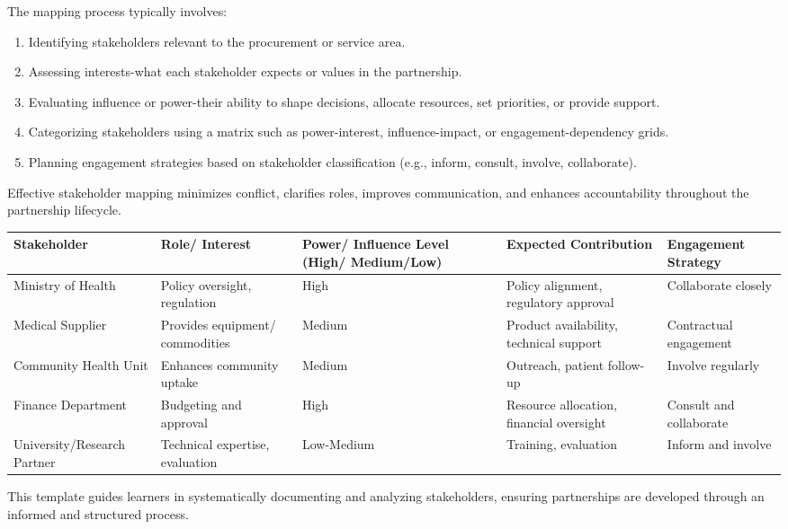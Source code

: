 \documentclass[10pt]{article}
\begin{document}
The mapping process typically involves:

\begin{enumerate}
  \item Identifying stakeholders relevant to the procurement or service area.
  \item Assessing interests-what each stakeholder expects or values in the partnership.
  \item Evaluating influence or power-their ability to shape decisions, allocate resources, set priorities, or provide support.
  \item Categorizing stakeholders using a matrix such as power-interest, influence-impact, or engagement-dependency grids.
  \item Planning engagement strategies based on stakeholder classification (e.g., inform, consult, involve, collaborate).
\end{enumerate}

Effective stakeholder mapping minimizes conflict, clarifies roles, improves communication, and enhances accountability throughout the partnership lifecycle.

\begin{table}[h]
\begin{center}
\begin{tabular}{|l|l|l|l|l|}
\hline
Stakeholder & Role/ Interest & Power/ Influence Level (High/ Medium/Low) & Expected Contribution & Engagement Strategy \\
\hline
Ministry of Health & Policy oversight, regulation & High & Policy alignment, regulatory approval & Collaborate closely \\
\hline
Medical Supplier & Provides equipment/ commodities & Medium & Product availability, technical support & Contractual engagement \\
\hline
Community Health Unit & Enhances community uptake & Medium & Outreach, patient follow-up & Involve regularly \\
\hline
Finance Department & Budgeting and approval & High & Resource allocation, financial oversight & Consult and collaborate \\
\hline
University/Research Partner & Technical expertise, evaluation & Low-Medium & Training, evaluation & Inform and involve \\
\hline
\end{tabular}
\end{center}
\end{table}

This template guides learners in systematically documenting and analyzing stakeholders, ensuring partnerships are developed through an informed and structured process.
\end{document}

